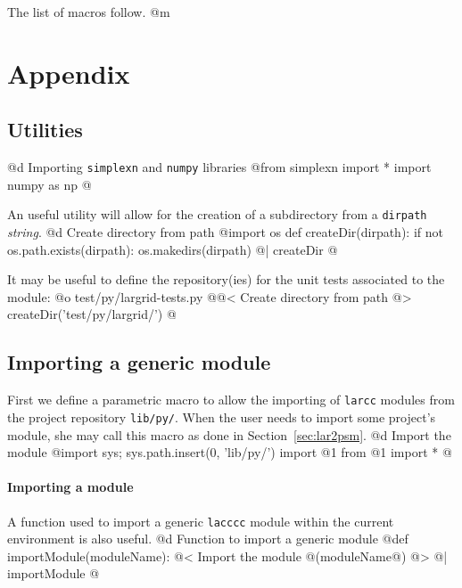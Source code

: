 \documentclass[11pt,oneside]{article}	%
\begin{document}
The list of macros follow.
@m

\appendix
\section{Appendix}
\label{sec:utilities}

\subsection{Utilities}

@d Importing \texttt{simplexn} and \texttt{numpy} libraries
@{from simplexn import *
import numpy as np
@}

An useful utility will allow for the creation of a subdirectory from a \texttt{dirpath} \emph{string}.
@d Create directory from path 
@{import os
def createDir(dirpath):
    if not os.path.exists(dirpath):
        os.makedirs(dirpath)
@| createDir @}

It may be useful to define the repository(ies) for the unit tests associated to the module:
@o test/py/largrid-tests.py
@{@< Create directory from path @>
createDir('test/py/largrid/')
@}

\subsection{Importing a generic module}
First we define a parametric macro to allow the importing of \texttt{larcc} modules from the project repository \texttt{lib/py/}. When the user needs to import some project's module, she may call this macro as done in Section~\ref{sec:lar2psm}.
@d Import the module
@{import sys; sys.path.insert(0, 'lib/py/')
import @1
from @1 import *
@}

\paragraph{Importing a module} A function used to import a generic \texttt{lacccc} module within the current environment is also useful.
@d Function to import a generic module
@{def importModule(moduleName):
	@< Import the module @(moduleName@) @>
@| importModule @}






\end{document}
